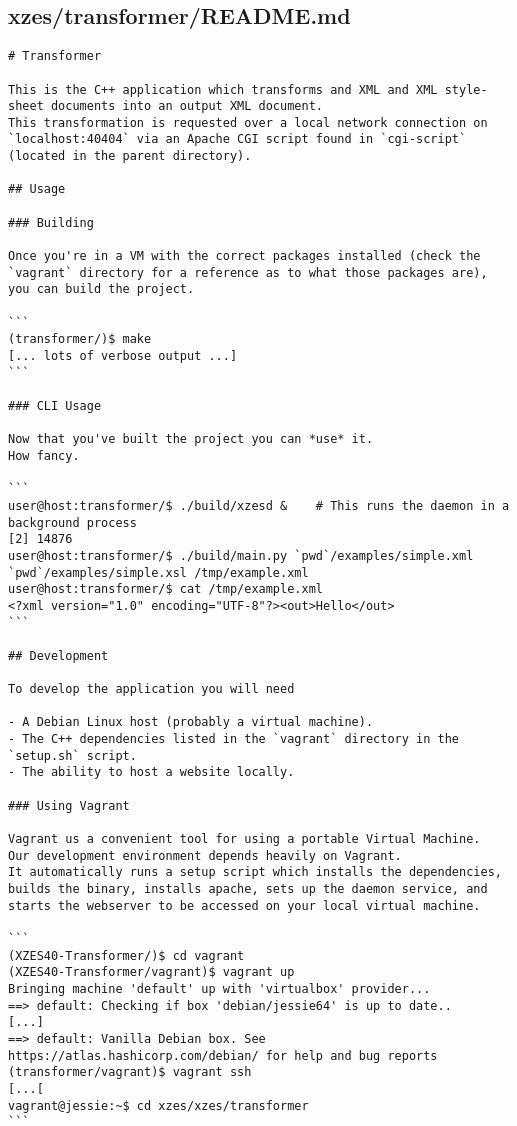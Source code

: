 \subsection{xzes/transformer/README.md}
\begin{lstlisting}
# Transformer

This is the C++ application which transforms and XML and XML style-sheet documents into an output XML document.
This transformation is requested over a local network connection on `localhost:40404` via an Apache CGI script found in `cgi-script` (located in the parent directory).

## Usage

### Building

Once you're in a VM with the correct packages installed (check the `vagrant` directory for a reference as to what those packages are), you can build the project.

```
(transformer/)$ make
[... lots of verbose output ...]
```

### CLI Usage

Now that you've built the project you can *use* it.
How fancy.

```
user@host:transformer/$ ./build/xzesd &    # This runs the daemon in a background process
[2] 14876
user@host:transformer/$ ./build/main.py `pwd`/examples/simple.xml `pwd`/examples/simple.xsl /tmp/example.xml
user@host:transformer/$ cat /tmp/example.xml
<?xml version="1.0" encoding="UTF-8"?><out>Hello</out>
```

## Development

To develop the application you will need

- A Debian Linux host (probably a virtual machine).
- The C++ dependencies listed in the `vagrant` directory in the `setup.sh` script.
- The ability to host a website locally.

### Using Vagrant

Vagrant us a convenient tool for using a portable Virtual Machine.
Our development environment depends heavily on Vagrant.
It automatically runs a setup script which installs the dependencies, builds the binary, installs apache, sets up the daemon service, and starts the webserver to be accessed on your local virtual machine.

```
(XZES40-Transformer/)$ cd vagrant
(XZES40-Transformer/vagrant)$ vagrant up
Bringing machine 'default' up with 'virtualbox' provider...
==> default: Checking if box 'debian/jessie64' is up to date..
[...]
==> default: Vanilla Debian box. See https://atlas.hashicorp.com/debian/ for help and bug reports
(transformer/vagrant)$ vagrant ssh
[...[
vagrant@jessie:~$ cd xzes/xzes/transformer
```


\end{lstlisting}
